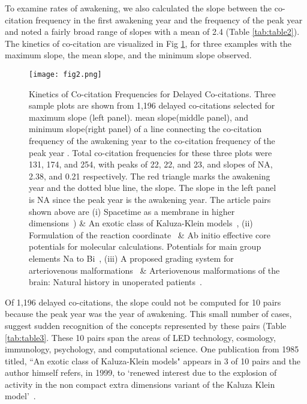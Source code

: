 \documentclass[utf8]{frontiersSCNS}
\begin{document}
To examine rates of awakening, we also calculated the slope between the co-citation frequency in the first awakening year and the frequency of the peak year and noted a fairly broad range of slopes with a mean of 2.4 (Table \ref{tab:table2}). The kinetics of co-citation are visualized in Fig \ref{fig:fig2}, for three examples with the maximum slope, the mean slope, and the minimum slope observed.  
\begin{figure}[h!]
\begin{center}
\texttt{[image: fig2.png]}%
\end{center}
\caption{Kinetics of Co-citation Frequencies for Delayed Co-citations. Three sample plots are shown from 1,196 delayed co-citations selected for maximum slope (left panel). mean slope(middle panel), and minimum slope(right panel) of a line connecting the co-citation frequency of the awakening year to the co-citation frequency of the peak year . Total co-citation frequencies for these three plots were 131, 174, and 254, with peaks of 22, 22, and 23, and slopes of NA, 2.38, and 0.21 respectively. The red triangle marks the awakening year and the dotted blue line, the slope. The slope in the left panel is NA since the peak year is the awakening year. The article pairs shown above are (i) Spacetime as a membrane in higher dimensions~\citep{Gibbons1987}) \& An exotic class of Kaluza-Klein models~\citep{Visser1985}, (ii) Formulation of the reaction coordinate~\citep{Fukui1970} \& Ab initio effective core potentials for molecular calculations. Potentials for main group elements Na to Bi~\citep{Wadt1985}, (iii) A proposed grading system for arteriovenous malformations~\citep{Spetzler1986} \& Arteriovenous malformations of the brain: Natural history in unoperated patients~\citep{Crawford1986}.}
\label{fig:fig2}
\end{figure}

Of 1,196 delayed co-citations, the slope could not be computed for 10 pairs because the peak year was the year of awakening. This small number of cases, suggest sudden recognition of the concepts represented by these pairs (Table \ref{tab:table3}. These 10 pairs span the areas of LED technology, cosmology, immunology, psychology, and computational science. One publication from 1985 titled, ``An exotic class of Kaluza-Klein models" appears in 3 of 10 pairs and the author himself refers, in 1999, to `renewed interest due to the explosion of activity in the non compact extra dimensions variant of the Kaluza Klein model'~\citep{visser_1999}.
\end{document}
